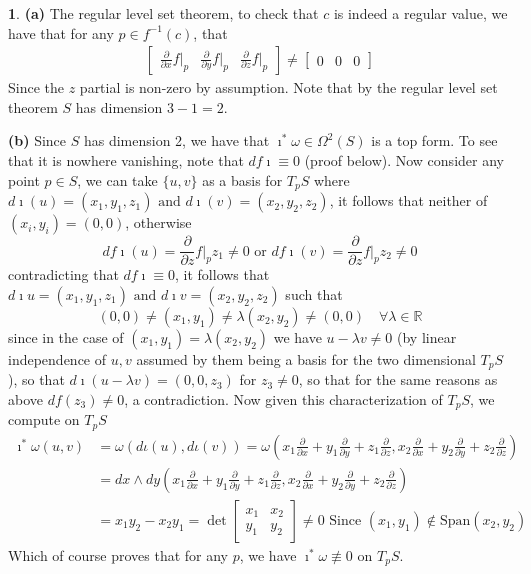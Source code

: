 \documentclass[10.5pt]{article}
\theoremstyle{definition}
\newtheorem{pb}{}
\newcommand{\set}[1]{\{#1\}}
\newcommand{\tand}{\text{ and }}
\newcommand{\tor}{\text{ or }}
\newcommand{\parx}{\frac{\partial}{\partial x}}
\newcommand{\pary}{\frac{\partial}{\partial y}}
\newcommand{\parz}{\frac{\partial}{\partial z}}
\newcommand{\z}{\imath}
\begin{document}
    \begin{pb}
        \textbf{(a)} The regular level set theorem, to check that \(c\) is indeed a regular value,
        we have that for any \(p \in f^{-1}(c)\), that
        \begin{align*}
            \begin{bmatrix}
                \parx f\vert_p & \pary f\vert_p & \parz f\vert_p
            \end{bmatrix} \neq 
            \begin{bmatrix}
                0 & 0 & 0
            \end{bmatrix}
        \end{align*}
        Since the \(z\) partial is non-zero by assumption. Note that by the regular level set theorem \(S\) has dimension \(3-1 = 2\).

        \textbf{(b)} Since \(S\) has dimension 2, we have that \(\z^* \omega \in \Omega^2(S)\) is a top form. To see that it is nowhere vanishing, note that \(df\z \equiv 0\) (proof below). Now consider any point \(p \in S\), we can take \(\set{u,v}\) as a basis for \(T_pS\) where \(d\z(u) = (x_1,y_1,z_1) \tand d\z(v) = (x_2,y_2,z_2)\), it follows that neither of \((x_i,y_i) = (0,0)\), otherwise 
        \[df\z(u) = \parz f \vert_pz_1 \neq 0 \tor df\z(v) = \parz f \vert_pz_2 \neq 0\]
        contradicting that \(df\z \equiv 0\), it follows that
        \(d\z u = (x_1,y_1,z_1) \tand d\z v = (x_2,y_2,z_2)\) such that 
        \[(0,0) \neq (x_1,y_1) \neq \lambda(x_2,y_2) \neq (0,0) \quad \forall \lambda \in \mathbb{R}\] 
        since in the case of \((x_1,y_1) = \lambda(x_2,y_2)\) we have \(u- \lambda v \neq 0\) (by linear independence of \(u,v\) assumed by them being a basis for the two dimensional \(T_pS\)), so that \(d\z(u - \lambda v) = (0,0,z_3)\) for \(z_3 \neq 0\), so that for the same reasons as above \(df(z_3) \neq 0\), a contradiction. Now given this characterization of \(T_pS\), we compute on 
        \(T_pS\)
        \begin{align*}
            \z^*\omega(u,v) &= \omega(d\iota(u),d\iota(v)) = \omega(x_1\parx + y_1 \pary + z_1\parz,x_2\parx + y_2 \pary + z_2\parz) \\
            &= dx\wedge dy (x_1\parx + y_1 \pary + z_1\parz,x_2\parx + y_2 \pary + z_2\parz)\\
            &= x_1y_2 - x_2y_1 = \det \begin{bmatrix}
                x_1 & x_2 \\
                y_1 & y_2
            \end{bmatrix} \neq 0 \text{ Since } (x_1,y_1) \not \in \text{Span}(x_2,y_2)
        \end{align*}
        Which of course proves that for any \(p\), we have \(\z^*\omega \not \equiv 0\) on \(T_pS\).


\end{pb}
\end{document}
